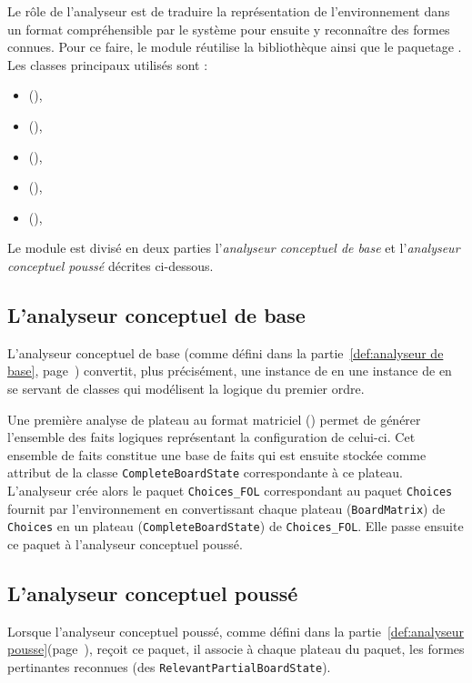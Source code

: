 Le rôle de l'analyseur est de traduire la représentation de l'environnement dans un format compréhensible par le système pour ensuite y reconnaître des formes connues. Pour ce faire, le module réutilise la bibliothèque  ainsi que le paquetage . Les classes principaux utilisés sont :
\begin{itemize}
  \item {} (),
  \item {} (),
  \item {} (),
  \item {} (),
  \item {} (),
\end{itemize}
Le module est divisé en deux parties l'\emph{analyseur conceptuel de base} et l'\emph{analyseur conceptuel poussé} décrites ci-dessous.
 
\subsection{L'analyseur conceptuel de base}
L'analyseur conceptuel de base (comme défini dans la partie~\ref{def:analyseur de base}, page~\pageref{def:analyseur de base}) convertit, plus précisément, une instance de  en une instance de  en se servant de classes qui modélisent la logique du premier ordre. 

Une première analyse de plateau au format matriciel () permet de générer l'ensemble des faits logiques représentant la configuration de celui-ci. Cet ensemble de faits constitue une base de faits qui est ensuite stockée comme attribut de la classe \texttt{CompleteBoardState} correspondante à ce plateau. L'analyseur crée alors le paquet \texttt{Choices\_FOL} correspondant au paquet \texttt{Choices} fournit par l'environnement en convertissant chaque plateau (\texttt{BoardMatrix}) de \texttt{Choices} en un plateau (\texttt{CompleteBoardState}) de \texttt{Choices\_FOL}. Elle passe ensuite ce paquet à l'analyseur conceptuel poussé. 
\subsection{L'analyseur conceptuel poussé}
Lorsque l'analyseur conceptuel poussé, comme défini dans la partie~\ref{def:analyseur pousse}(page~\pageref{def:analyseur pousse}), reçoit ce paquet, il associe à chaque plateau du paquet, les formes pertinantes reconnues (des \texttt{RelevantPartialBoardState}).


